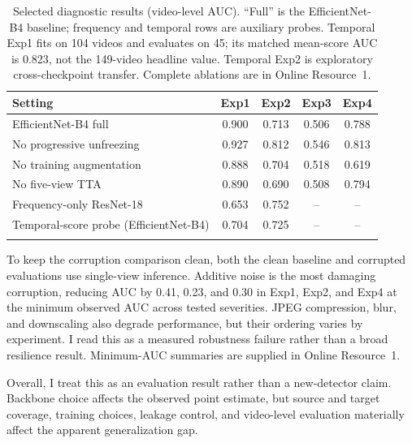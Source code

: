 \begin{table}[!t]
\caption{Selected diagnostic results (video-level AUC). ``Full'' is the EfficientNet-B4 baseline; frequency and temporal rows are auxiliary probes. Temporal Exp1 fits on 104 videos and evaluates on 45; its matched mean-score AUC is 0.823, not the 149-video headline value. Temporal Exp2 is exploratory cross-checkpoint transfer. Complete ablations are in Online Resource~1.}
\label{tab:compact_diagnostics}
\centering
\scriptsize
\setlength{\tabcolsep}{5pt}
\begin{tabular}{lcccc}
\toprule
Setting & Exp1 & Exp2 & Exp3 & Exp4 \\
\midrule
EfficientNet-B4 full & 0.900 & 0.713 & 0.506 & 0.788 \\
No progressive unfreezing & 0.927 & 0.812 & 0.546 & 0.813 \\
No training augmentation & 0.888 & 0.704 & 0.518 & 0.619 \\
No five-view TTA & 0.890 & 0.690 & 0.508 & 0.794 \\
Frequency-only ResNet-18 & 0.653 & 0.752 & -- & -- \\
Temporal-score probe (EfficientNet-B4) & 0.704 & 0.725 & -- & -- \\
\botrule
\end{tabular}
\end{table}

To keep the corruption comparison clean, both the clean baseline and corrupted evaluations use single-view inference. Additive noise is the most damaging corruption, reducing AUC by 0.41, 0.23, and 0.30 in Exp1, Exp2, and Exp4 at the minimum observed AUC across tested severities. JPEG compression, blur, and downscaling also degrade performance, but their ordering varies by experiment. I read this as a measured robustness failure rather than a broad resilience result. Minimum-AUC summaries are supplied in Online Resource~1.

Overall, I treat this as an evaluation result rather than a new-detector claim. Backbone choice affects the observed point estimate, but source and target coverage, training choices, leakage control, and video-level evaluation materially affect the apparent generalization gap.
